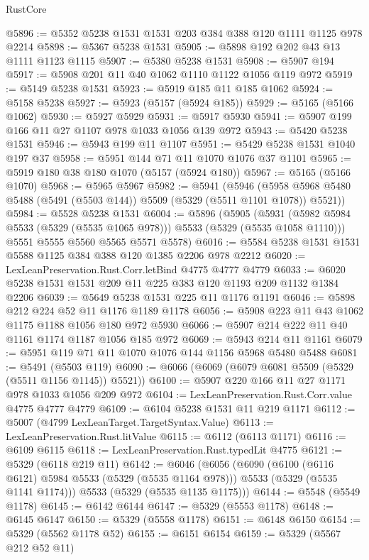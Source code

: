 \begin{lexlean}{RustCore}
\begin{coremodule}
@5896 := @5352 @5238 @1531 @1531 @203 @384 @388 @120 @1111 @1125 @978 @2214
@5898 := @5367 @5238 @1531
@5905 := @5898 @192 @202 @43 @13 @1111 @1123 @1115
@5907 := @5380 @5238 @1531
@5908 := @5907 @194
@5917 := @5908 @201 @11 @40 @1062 @1110 @1122 @1056 @119 @972
@5919 := @5149 @5238 @1531
@5923 := @5919 @185 @11 @185 @1062
@5924 := @5158 @5238
@5927 := @5923 (@5157 (@5924 @185))
@5929 := @5165 (@5166 @1062)
@5930 := @5927 @5929
@5931 := @5917 @5930
@5941 := @5907 @199 @166 @11 @27 @1107 @978 @1033 @1056 @139 @972
@5943 := @5420 @5238 @1531
@5946 := @5943 @199 @11 @1107
@5951 := @5429 @5238 @1531 @1040 @197 @37
@5958 := @5951 @144 @71 @11 @1070 @1076 @37 @1101
@5965 := @5919 @180 @38 @180 @1070 (@5157 (@5924 @180))
@5967 := @5165 (@5166 @1070)
@5968 := @5965 @5967
@5982 := @5941
    (@5946 (@5958 @5968 @5480 @5488 (@5491 (@5503 @144)) @5509 (@5329 (@5511 @1101 @1078)) @5521))
@5984 := @5528 @5238 @1531
@6004 := @5896
    (@5905
      (@5931 (@5982 @5984 @5533 (@5329 (@5535 @1065 @978))) @5533 (@5329 (@5535 @1058 @1110)))
      @5551
      @5555
      @5560
      @5565
      @5571
      @5578)
@6016 := @5584 @5238 @1531 @1531 @5588 @1125 @384 @388 @120 @1385 @2206 @978 @2212
@6020 := LexLeanPreservation.Rust.Corr.letBind @4775 @4777 @4779
@6033 := @6020 @5238 @1531 @1531 @209 @11 @225 @383 @120 @1193 @209 @1132 @1384 @2206
@6039 := @5649 @5238 @1531 @225 @11 @1176 @1191
@6046 := @5898 @212 @224 @52 @11 @1176 @1189 @1178
@6056 := @5908 @223 @11 @43 @1062 @1175 @1188 @1056 @180 @972 @5930
@6066 := @5907 @214 @222 @11 @40 @1161 @1174 @1187 @1056 @185 @972
@6069 := @5943 @214 @11 @1161
@6079 := @5951 @119 @71 @11 @1070 @1076 @144 @1156 @5968 @5480 @5488
@6081 := @5491 (@5503 @119)
@6090 := @6066 (@6069 (@6079 @6081 @5509 (@5329 (@5511 @1156 @1145)) @5521))
@6100 := @5907 @220 @166 @11 @27 @1171 @978 @1033 @1056 @209 @972
@6104 := LexLeanPreservation.Rust.Corr.value @4775 @4777 @4779
@6109 := @6104 @5238 @1531 @11 @219 @1171
@6112 := @5007 (@4799 LexLeanTarget.TargetSyntax.Value)
@6113 := LexLeanPreservation.Rust.litValue
@6115 := @6112 (@6113 @1171)
@6116 := @6109 @6115
@6118 := LexLeanPreservation.Rust.typedLit @4775
@6121 := @5329 (@6118 @219 @11)
@6142 := @6046
    (@6056
      (@6090
        (@6100 (@6116 @6121) @5984 @5533 (@5329 (@5535 @1164 @978)))
        @5533
        (@5329 (@5535 @1141 @1174)))
      @5533
      (@5329 (@5535 @1135 @1175)))
@6144 := @5548 (@5549 @1178)
@6145 := @6142 @6144
@6147 := @5329 (@5553 @1178)
@6148 := @6145 @6147
@6150 := @5329 (@5558 @1178)
@6151 := @6148 @6150
@6154 := @5329 (@5562 @1178 @52)
@6155 := @6151 @6154
@6159 := @5329 (@5567 @212 @52 @11)

\end{coremodule}
\end{lexlean}
